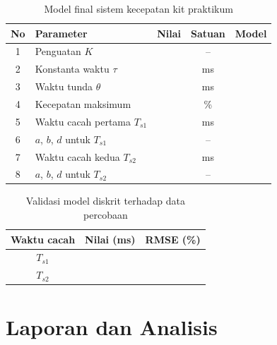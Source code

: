 \documentclass[11pt,a4paper]{article}
\begin{document}
\begin{table}[H]
	\centering
	\caption{Model final sistem kecepatan kit praktikum}
	\label{tab:p6_model}
	\begin{tabularx}{\textwidth}{|c|l|c|c|X|}
		\hline
		\textbf{No} & \textbf{Parameter}                   & \textbf{Nilai} & \textbf{Satuan} & \textbf{Model} \\
		\hline
		1           & Penguatan $K$                        &                & --              &                \\
		2           & Konstanta waktu $\tau$               &                & ms              &                \\
		3           & Waktu tunda $\theta$                 &                & ms              &                \\
		4           & Kecepatan maksimum                   &                & \%              &                \\
		5           & Waktu cacah pertama $T_{s1}$         &                & ms              &                \\
		6           & $a$, $b$, $d$ untuk $T_{s1}$         &                & --              &                \\
		7           & Waktu cacah kedua $T_{s2}$           &                & ms              &                \\
		8           & $a$, $b$, $d$ untuk $T_{s2}$         &                & --              &                \\
		\hline
	\end{tabularx}
\end{table}

\begin{table}[H]
	\centering
	\caption{Validasi model diskrit terhadap data percobaan}
	\label{tab:p6_validasi}
	\begin{tabular}{|c|c|c|}
		\hline
		\textbf{Waktu cacah} & \textbf{Nilai (ms)} & \textbf{RMSE (\%)} \\
		\hline
		$T_{s1}$             &                     &                    \\
		$T_{s2}$             &                     &                    \\
		\hline
	\end{tabular}
\end{table}

\section{Laporan dan Analisis}
\end{document}
